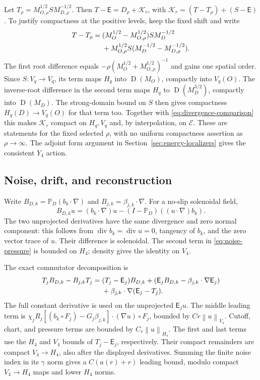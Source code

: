 \documentclass[11pt]{article}
\numberwithin{equation}{section}
\theoremstyle{remark}
\newcommand{\PP}{\mathbb P}
\newcommand{\divg}{\operatorname{div}}
\newcommand{\calE}{\mathcal E}
\newcommand{\norm}[1]{\left\lVert#1\right\rVert}
\DeclareMathOperator{\Dom}{D}
\begin{document}
Let $T_\rho=M_{O,\rho}^{1/2}SM_{D,\rho}^{-1/2}$.
Then $T-\mathsf E=D_\rho+\mathcal K_r$, with
$\mathcal K_r=(T-T_\rho)+(S-\mathsf E)$. To justify compactness at
the positive levels, keep the fixed shift and write
\begin{align}\label{eq:shift-difference}
 T-T_\rho={}&(M_O^{1/2}-M_{O,\rho}^{1/2})SM_D^{-1/2}\notag\\
 &+M_{O,\rho}^{1/2}S(M_D^{-1/2}-M_{D,\rho}^{-1/2}).
\end{align}
The first root difference equals
$-\rho(M_O^{1/2}+M_{O,\rho}^{1/2})^{-1}$ and gains one spatial
order. Since $S:V_q\to V_q$, its term maps $H_q$ into
$\Dom(M_O)$, compactly into $V_q(O)$. The inverse-root difference
in the second term maps $H_q$ to $\Dom(M_D^{3/2})$, compactly into
$\Dom(M_D)$. The strong-domain bound on $S$ then gives compactness
$H_q(D)\to V_q(O)$ for that term too. Together with
\eqref{eq:divergence-comparison} this makes $\mathcal K_r$ compact
on $H_q,V_q$ and, by interpolation, on $\calE$. These are statements
for the fixed selected $\rho$, with no uniform compactness assertion
as $\rho\to\infty$. The adjoint form argument in
Section~\ref{sec:energy-localizers} gives the consistent $Y_4$ action.

\subsection{Noise, drift, and reconstruction}\label{sec:reconstruction}

Write $B_{D,k}=\PP_D(b_k\cdot\nabla)$ and
$B_{j,k}=\beta_{j,k}\cdot\nabla$. For a no-slip solenoidal field,
\begin{equation}\label{eq:noise-pressure}
 B_{D,k}u=(b_k\cdot\nabla)u
 -(I-\PP_D)((u\cdot\nabla)b_k).
\end{equation}
The two unprojected derivatives have the same divergence and zero
normal component: this follows from $\divg b_k=\divg u=0$,
tangency of $b_k$, and the zero vector trace of $u$. Their difference
is solenoidal. The second term in \eqref{eq:noise-pressure} is bounded
on $H_4$; density gives the identity on $V_4$.

The exact commutator decomposition is
\begin{align}\label{eq:noise-commutator}
 T_jB_{D,k}-B_{j,k}T_j={}&(T_j-\mathsf E_j)B_{D,k}
 +(\mathsf E_jB_{D,k}-\beta_{j,k}\cdot\nabla\mathsf E_j)\notag\\
 &+\beta_{j,k}\cdot\nabla(\mathsf E_j-T_j).
\end{align}
The full constant derivative is used on the unprojected
$\mathsf E_ju$. The middle leading term is
$\chi_jR_j[(b_k\circ F_j)-G_j\beta_{j,k}]\cdot(\nabla u)\circ F_j$,
bounded by $Cr\norm{u}_{V_4}$. Cutoff, chart, and pressure terms
are bounded by $C_r\norm{u}_{H_4}$. The first and last terms use
the $H_4$ and $V_4$ bounds of $T_j-\mathsf E_j$, respectively.
Their compact remainders are compact $V_4\to H_4$, also after the
displayed derivatives. Summing the finite noise index in its
$\gamma$ norm gives a $C(a(r)+r)$ leading bound, modulo compact
$V_4\to H_4$ maps and lower $H_4$ norms.
\end{document}
